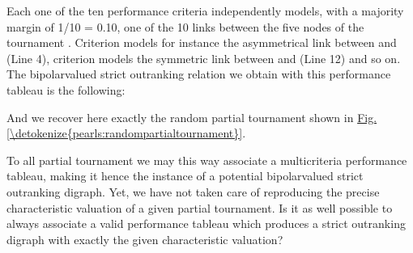 \documentclass[a4paper,12pt,english]{sphinxhowto}
\begin{document}
\sphinxAtStartPar
Each one of the ten performance criteria independently models, with a majority margin of 1/10 = 0.10,  one of the 10 links between the five nodes of the tournament .  Criterion  models for instance the asymmetrical link between  and  (Line 4), criterion  models the symmetric link between  and  (Line 12) and so on. The bipolar\sphinxhyphen{}valued strict outranking relation we obtain with this performance tableau is the following:

\begin{sphinxVerbatim}[commandchars=\\\{\},numbers=left,firstnumber=1,stepnumber=1]
\end{sphinxVerbatim}

\sphinxAtStartPar
And we recover here exactly the random partial tournament shown in \hyperref[\detokenize{pearls:randompartialtournament}]{Fig.\@ \ref{\detokenize{pearls:randompartialtournament}}}.

\sphinxAtStartPar
To all partial tournament we may this way associate a multicriteria performance tableau, making it hence the instance of a potential bipolar\sphinxhyphen{}valued strict outranking digraph. Yet, we have not taken care of reproducing the precise characteristic valuation of a given partial tournament. Is it as well possible to always associate a valid performance tableau which produces a strict outranking digraph with exactly the given characteristic valuation?
\end{document}

